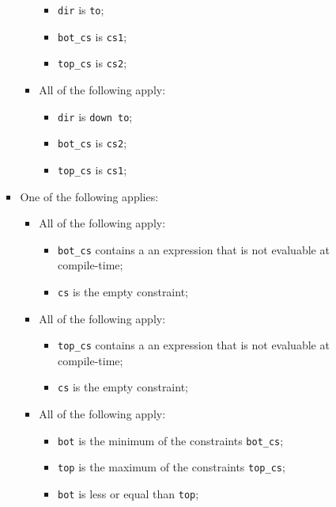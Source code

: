 \documentclass{book}
\begin{document}
\begin{itemize}
\begin{itemize}
\begin{itemize}
\begin{itemize}
                 \begin{itemize}
                   \item \texttt{dir} is \texttt{to};
                   \item \texttt{bot\_cs} is \texttt{cs1};
                   \item \texttt{top\_cs} is \texttt{cs2};
                 \end{itemize}
               \item All of the following apply:
                 \begin{itemize}
                   \item \texttt{dir} is \texttt{down to};
                   \item \texttt{bot\_cs} is \texttt{cs2};
                   \item \texttt{top\_cs} is \texttt{cs1};
                 \end{itemize}
             \end{itemize}
           \item One of the following applies:
             \begin{itemize}
               \item All of the following apply:
                 \begin{itemize}
                   \item \texttt{bot\_cs} contains a an expression that is not evaluable at compile-time;
                   \item \texttt{cs} is the empty constraint;
                 \end{itemize}
               \item All of the following apply:
                 \begin{itemize}
                   \item \texttt{top\_cs} contains a an expression that is not evaluable at compile-time;
                   \item \texttt{cs} is the empty constraint;
                 \end{itemize}
               \item All of the following apply:
                 \begin{itemize}
                   \item \texttt{bot} is the minimum of the constraints \texttt{bot\_cs};
                   \item \texttt{top} is the maximum of the constraints \texttt{top\_cs};
                   \item \texttt{bot} is less or equal than \texttt{top};

\end{itemize}
\end{itemize}
\end{itemize}
\end{itemize}
\end{itemize}
\end{document}
